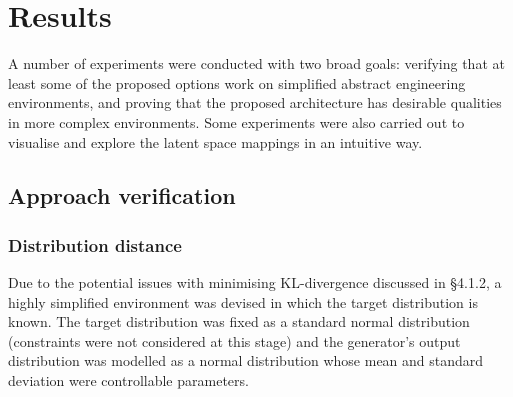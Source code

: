 \documentclass[../../main.tex]{subfiles}
\begin{document}
\chapter{Results}

A number of experiments were conducted with two broad goals: verifying that at least some of the proposed options work on simplified abstract engineering environments, and proving that the proposed architecture has desirable qualities in more complex environments.
Some experiments were also carried out to visualise and explore the latent space mappings in an intuitive way.

\section{Approach verification}

\subsection{Distribution distance}

Due to the potential issues with minimising KL-divergence discussed in \S4.1.2, a highly simplified environment was devised in which the target distribution is known.
The target distribution was fixed as a standard normal distribution (constraints were not considered at this stage) and the generator's output distribution was modelled as a normal distribution whose mean and standard deviation were controllable parameters.
\end{document}
